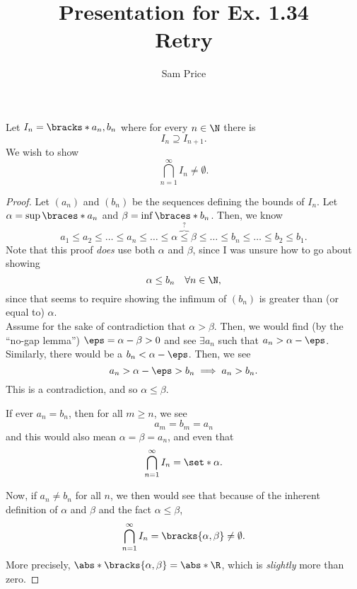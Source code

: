 \documentclass{article}
\author{Sam Price}
\title{Presentation for Ex. 1.34\\\Large{Retry}}
\begin{document}
\maketitle

Let $I_{n} = \bracks*{a_{n}, b_{n}}$ where for every $n \in \N$ there is
\[ I_{n} \supseteq I_{n + 1}. \]
We wish to show \[ \bigcap_{n = 1}^{\infty}I_{n} \ne \emptyset. \]

\begin{proof}
Let $(a_{n})$ and $(b_{n})$ be the sequences defining the bounds of $I_{n}$.
Let $\alpha = \sup\braces*{a_{n}}$ and $\beta = \inf\braces*{b_{n}}$.
Then, we know
\[ a_{1} \le a_{2} \le \ldots \le a_{n} \le \ldots \le \alpha \overbrace{ \le }^{?} \beta \le \ldots \le b_{n} \le \ldots \le b_{2} \le b_{1}. \]
Note that this proof \emph{does} use both $\alpha$ and $\beta$, since I was unsure how to go about showing
\[ \alpha \le b_{n} \quad \forall n \in \N, \]
since that seems to require showing the infimum of $(b_{n})$ is greater than (or equal to) $\alpha$.\\

\noindent
Assume for the sake of contradiction that $\alpha > \beta$. Then, we would find (by the ``no-gap lemma'') $\eps = \alpha - \beta > 0$ and see $\exists a_{n}$
such that $a_{n} > \alpha - \eps$. Similarly, there would be a $b_{n} < \alpha - \eps$. Then, we see
\[ a_{n} > \alpha - \eps > b_{n} \implies a_{n} > b_{n}. \]
This is a contradiction, and so $\alpha \le \beta$.

\noindent
If ever $a_{n} = b_{n}$, then for all $m \ge n$, we see
\[ a_{m} = b_{m} = a_{n} \]
and this would also mean $\alpha = \beta = a_{n}$, and even that
\[ \bigcap_{n = 1}^{\infty}I_{n} = \set*{\alpha}. \]

\noindent
Now, if $a_{n} \ne b_{n}$ for all $n$, we then would see that because of the inherent definition of $\alpha$ and $\beta$ and the fact $\alpha \le \beta$,
\[ \bigcap_{n = 1}^{\infty}I_{n} = \bracks{\alpha, \beta} \ne \emptyset. \]
More precisely, $\abs*{\bracks{\alpha, \beta}} = \abs*{\R}$, which is \emph{slightly} more than zero.

\end{proof}
\end{document}
